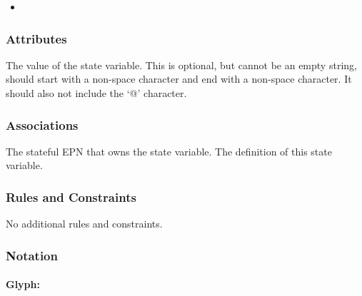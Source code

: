 \begin{itemize}
\item {}
\end{itemize}

\subsubsection{Attributes}

\begin{attributes}
   The value of the state variable. This is
  optional, but cannot be an empty string, should start with a
  non-space character and end with a non-space character. It should
  also not include the `@' character.
\end{attributes}

\subsubsection{Associations}

\begin{attributes}
    The stateful EPN that owns
  the state variable.
   The definition of
  this state variable.
\end{attributes}

\subsubsection{Rules and Constraints}

No additional rules and constraints.

\subsubsection{Notation}


\paragraph{Glyph: }
\label{sec:techref:stateVariable}


